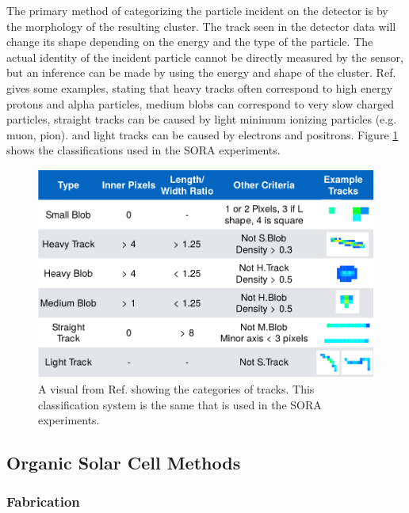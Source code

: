 The primary method of categorizing the particle incident on the detector is by the morphology of the resulting cluster.
The track seen in the detector data will change its shape depending on the energy and the type of the particle.
The actual identity of the incident particle cannot be directly measured by the sensor, but an inference can be made by using the energy and shape of the cluster. Ref. \cite{Stuart-Thesis} gives some examples, stating that heavy tracks often correspond to high energy protons and alpha particles, medium blobs can correspond to very slow charged particles, straight tracks can be caused by light minimum ionizing particles (e.g. muon, pion). and light tracks can be caused by electrons and positrons.     
Figure \ref{fig:stuart-track-types} shows the classifications used in the SORA experiments.
\begin{figure}[h!]
	\begin{center}
		\includegraphics[width=\textwidth]{figures/stuart-track-types.pdf}
		\caption{A visual from Ref. \cite{Stuart-Thesis} showing the categories of tracks. This classification system is the same that is used in the SORA experiments.}
		\label{fig:stuart-track-types}
	\end{center}
\end{figure}

\subsection{Organic Solar Cell Methods}
\label{sec:Solar-Cell-Methods}


\subsubsection{Fabrication}

